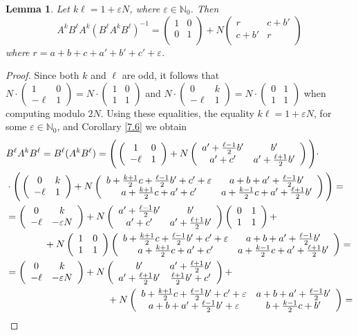 \documentclass[10pt]{amsart}
\theoremstyle{plain}
\newtheorem{lemma}[theorem]{Lemma}
\theoremstyle{definition}
\theoremstyle{remark}%
\newcommand{\N}{\mathbb{N}}
\newcommand{\mat}[4]{\left(\begin{array}{cc}
 #1 & #2\\
 #3 & #4\\
\end{array}\right)}
\begin{document}
\begin{lemma}\label{5.2}
Let $k\ell=1+\varepsilon N$, where $\varepsilon\in\N_0$. Then $$A^k B^{\ell}A^k(B^{\ell}A^k B^{\ell})^{-1}=\mat{1}{0}{0}{1}+
 N\mat{r}{c+b'}{c+b'}{r}$$
where $r=a+b+c+a'+b'+c'+\varepsilon$.
\end{lemma}
\begin{proof}
Since both $k$ and $\ell$ are odd, it follows that $N\cdot(\begin{smallmatrix}1 & 0\\ -\ell & 1\end{smallmatrix})=N\cdot(\begin{smallmatrix}1 & 0\\ 1 & 1\end{smallmatrix})$ and $N\cdot(\begin{smallmatrix}0 & k\\ -\ell & 1\end{smallmatrix})=N\cdot(\begin{smallmatrix}0 & 1\\ 1 & 1\end{smallmatrix})$ when computing modulo $2N$. Using these equalities, the equality $k\ell=1+\varepsilon N$, for some $\varepsilon\in\N_{0}$, and Corollary \ref{7.6} we obtain
\begin{align*}
 &B^{\ell}A^k B^{\ell}=B^{\ell}(A^k B^{\ell})=\Bigg(\mat{1}{0}{-\ell}{1}+N\mat{a'+\frac{\ell-1}{2}b'}{b'}{a'+c'}{a'+\frac{\ell+1}{2}b'}\Bigg)\cdot\\
 &\cdot\Bigg(\mat{0}{k}{-\ell}{1}+
 N\mat{b+\frac{k+1}{2}c+\frac{\ell-1}{2}b'+c'+\varepsilon}{a+b+a'+\frac{\ell-1}{2}b'}{a+\frac{k+1}{2}c+a'+c'}{a+\frac{k-1}{2}c+a'+\frac{\ell+1}{2}b'}\Bigg)=\\
 & =\mat{0}{k}{-\ell}{-\varepsilon N}+
N\mat{a'+\frac{\ell-1}{2}b'}{b'}{a'+c'}{a'+\frac{\ell+1}{2}b'}\mat{0}{1}{1}{1}+\\
&\hspace{14mm}+N\mat{1}{0}{1}{1}\mat{b+\frac{k+1}{2}c+\frac{\ell-1}{2}b'+c'+\varepsilon}{a+b+a'+\frac{\ell-1}{2}b'}{a+\frac{k+1}{2}c+a'+c'}{a+\frac{k-1}{2}c+a'+\frac{\ell+1}{2}b'}=\\
&=\mat{0}{k}{-\ell}{-\varepsilon N}+
 N\mat{b'}{a'+\frac{\ell+1}{2}b'}{a'+\frac{\ell+1}{2}b'}{\frac{\ell+1}{2}b'+c'}+\\
 &\hspace{37mm}+N\mat{b+\frac{k+1}{2}c+\frac{\ell-1}{2}b'+c'+\varepsilon}{a+b+a'+\frac{\ell-1}{2}b'}{a+b+a'+\frac{\ell-1}{2}b'+\varepsilon}{b+\frac{k-1}{2}c+b'}=\\

\end{align*}
\end{proof}
\end{document}
